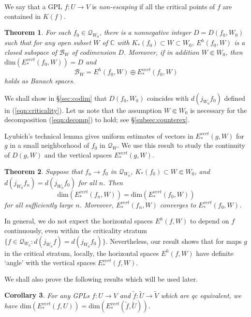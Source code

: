 \documentclass{amsart}
\numberwithin{equation}{section}
\newtheorem{theorem}{Theorem}[section]
\newtheorem{corollary}[theorem]{Corollary}%
\newcommand{\C}{\mathbb C}
\theoremstyle{definition}
\theoremstyle{remark}
\begin{document}
We say that a GPL $f:U\to V$ is {\em non-escaping} if all the critical points of $f$ are contained in $K(f)$.
\fi

\begin{theorem}\label{thm:codimEh0} For each $f_0\in \mathcal{Q}_{W_0}$, there is a nonnegative integer $D=D(f_0,W_0)$ such that for any open subset $W$ of $\C$ with $K_*(f_0)\subset W\subset W_0$, $E^h(f_0,W)$ is a closed subspace of $\mathcal{B}_{W}$ of codimension $D$. Moreover, if in addition $W\Subset W_0$, then $\text{dim}(E^{vert}_*(f_0,W))=D$ and 
\begin{equation}\label{eqn:decomp}
\mathcal{B}_{W}=E^h(f_0, W)\oplus E^{vert}_*(f_0,W)
\end{equation}
holds as Banach spaces.  
\end{theorem}
  


We shall show in \S\ref{sec:codim} that $D(f_0, W_0)$ coincides with $d(j_{W_0}f_0)$ defined in (\ref{eqn:criticality}).
Let us note that the assumption $W\Subset W_0$ is necessary for the decomposition (\ref{eqn:decomp}) to hold; see \S\ref{subsec:counterex}.

Lyubich's technical lemma gives uniform estimates of vectors in $E^{vert}_*(g,W)$ for $g$ in a small neighborhood of $f_0$ in $\mathcal{Q}_W$. We use this result to study the continuity of $D(g,W)$ and the vertical spaces $E^{vert}_*(g,W)$.

\begin{theorem}\label{thm:continuity} Suppose that $f_n\to f_0$ in $\mathcal{Q}_{W_0}$, $K_*(f_0)\subset W\Subset W_0$, and $d(j_{W_0}f_n)=d(j_{W_0}f_0)$ for all $n$. Then $$\text{dim}(E^{vert}_*(f_n,W))=\text{dim}(E^{vert}_*(f_0,W))$$ for all sufficiently large $n$. Moreover, 
$E^{vert}_*(f_n,W)$ converges to $E^{vert}_*(f_0,W)$.
\end{theorem}

In general, we do not expect the horizontal spaces $E^h(f,W)$ to depend on $f$ continuously, even within the criticality stratum $\{f\in \mathcal{Q}_{W_0}: d(j_{W_0}f)=d(j_{W_0}f_0)\}$. Nevertheless, our result shows that for maps $g$ in the critical stratum, locally, the horizontal spaces $E^h(f,W)$ have definite `angle' with the vertical spaces $E^{vert}_*(f,W)$.  

We shall also prove the following results which will be used later.

\begin{corollary}\label{cor:Dfgerm} For any GPLs $f:U\to V$ and $\widetilde{f}:\widetilde{U}\to \widetilde{V}$ which are qc equivalent, we have
$\text{dim}(E_*^{vert}(f,U))=\text{dim}(E^{vert}_*(\widetilde{f},\widetilde{U}))$.
\end{corollary}
\end{document}
